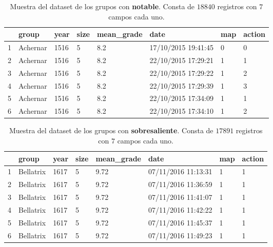 \documentclass[10pt,a4paper]{article}
\begin{document}
\begin{table}[ht]
\centering
\begin{tabular}{rlllllll}
  \hline
 & group & year & size & mean\_grade & date & map & action \\ 
  \hline
1 & Achernar & 1516 & 5 & 8.2 & 17/10/2015 19:41:45 & 0 & 0 \\ 
  2 & Achernar & 1516 & 5 & 8.2 & 22/10/2015 17:29:21 & 1 & 1 \\ 
  3 & Achernar & 1516 & 5 & 8.2 & 22/10/2015 17:29:22 & 1 & 2 \\ 
  4 & Achernar & 1516 & 5 & 8.2 & 22/10/2015 17:29:39 & 1 & 3 \\ 
  5 & Achernar & 1516 & 5 & 8.2 & 22/10/2015 17:34:09 & 1 & 1 \\ 
  6 & Achernar & 1516 & 5 & 8.2 & 22/10/2015 17:34:10 & 1 & 2 \\ 
   \hline
\end{tabular}
\caption{Muestra del dataset de los grupos con \textbf{notable}. Consta de $18840$ registros con $7$ campos cada uno.}
\label{table:13}
\end{table}

\begin{table}[ht]
\centering
\begin{tabular}{rlllllll}
  \hline
 & group & year & size & mean\_grade & date & map & action \\ 
  \hline
1 & Bellatrix & 1617 & 5 & 9.72 & 07/11/2016 11:13:31 & 1 & 1 \\ 
  2 & Bellatrix & 1617 & 5 & 9.72 & 07/11/2016 11:36:59 & 1 & 1 \\ 
  3 & Bellatrix & 1617 & 5 & 9.72 & 07/11/2016 11:41:07 & 1 & 1 \\ 
  4 & Bellatrix & 1617 & 5 & 9.72 & 07/11/2016 11:42:22 & 1 & 1 \\ 
  5 & Bellatrix & 1617 & 5 & 9.72 & 07/11/2016 11:45:37 & 1 & 1 \\ 
  6 & Bellatrix & 1617 & 5 & 9.72 & 07/11/2016 11:49:23 & 1 & 1 \\ 
   \hline
\end{tabular}
\caption{Muestra del dataset de los grupos con \textbf{sobresaliente}. Consta de $17891$ registros con $7$ campos cada uno.}
\label{table:14}
\end{table}
\end{document}
